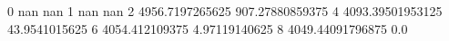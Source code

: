 0 nan nan
1 nan nan
2 4956.7197265625 907.27880859375
4 4093.39501953125 43.9541015625
6 4054.412109375 4.97119140625
8 4049.44091796875 0.0
